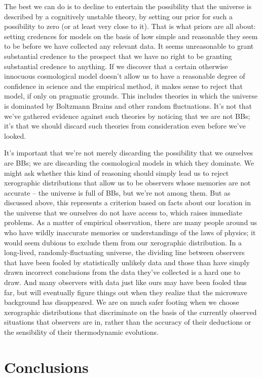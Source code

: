 \documentclass[12pt,letterpaper]{article}
\begin{document}
The best we can do is to decline to entertain the possibility that the universe is described by a cognitively unstable theory, by setting our prior for such a possibility to zero (or at least very close to it). 
That is what priors are all about: setting credences for models on the basis of how simple and reasonable they seem to be before we have collected any relevant data.
It seems unreasonable to grant substantial credence to the prospect that we have no right to be granting substantial credence to anything.
If we discover that a certain otherwise innocuous cosmological model doesn't allow us to have a reasonable degree of confidence in science and the empirical method, it makes sense to reject that model, if only on pragmatic grounds. 
This includes theories in which the universe is dominated by Boltzmann Brains and other random fluctuations.
It's not that we've gathered evidence against such theories by noticing that we are not BBs; it's that we should discard such theories from consideration even before we've looked.

It's important that we're not merely discarding the possibility that we ourselves are BBs; we are discarding the cosmological models in which they dominate.
We might ask whether this kind of reasoning should simply lead us to reject xerographic distributions that allow us to be observers whose memories are not accurate -- the universe is full of BBs, but we're not among them.
But as discussed above, this represents a criterion based on facts about our location in the universe that we ourselves do not have access to, which raises immediate problems.
As a matter of empirical observation, there are many people around us who have wildly inaccurate memories or understandings of the laws of physics; it would seem dubious to exclude them from our xerographic distribution.
In a long-lived, randomly-fluctuating universe, the dividing line between observers that have been fooled by statistically unlikely data and those than have simply drawn incorrect conclusions from the data they've collected is a hard one to draw.
And many observers with data just like ours may have been fooled thus far, but will eventually figure things out when they realize that the microwave background has disappeared.
We are on much safer footing when we choose xerographic distributions that discriminate on the basis of the currently observed situations that observers are in, rather than the accuracy of their deductions or the sensibility of their thermodynamic evolutions.

\section{Conclusions}
\end{document}
